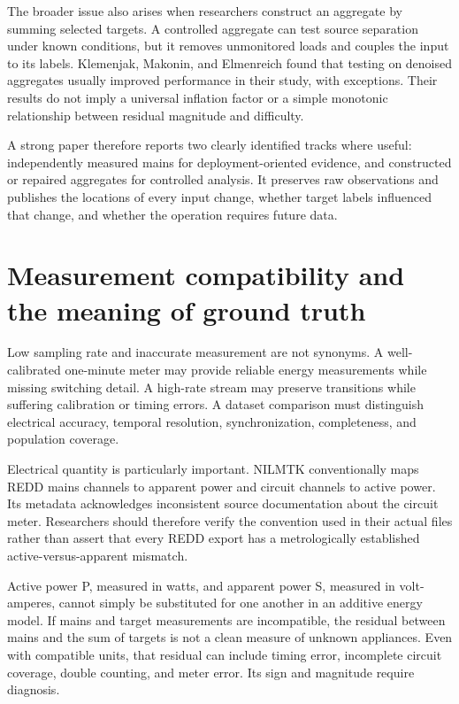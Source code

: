 \documentclass[11pt,letterpaper]{article}
\begin{document}
The broader issue also arises when researchers construct an aggregate by summing selected targets. A controlled aggregate can test source separation under known conditions, but it removes unmonitored loads and couples the input to its labels. Klemenjak, Makonin, and Elmenreich found that testing on denoised aggregates usually improved performance in their study, with exceptions. Their results do not imply a universal inflation factor or a simple monotonic relationship between residual magnitude and difficulty. \cite{ref11}

A strong paper therefore reports two clearly identified tracks where useful: independently measured mains for deployment-oriented evidence, and constructed or repaired aggregates for controlled analysis. It preserves raw observations and publishes the locations of every input change, whether target labels influenced that change, and whether the operation requires future data.

\section{Measurement compatibility and the meaning of ground truth}
Low sampling rate and inaccurate measurement are not synonyms. A well-calibrated one-minute meter may provide reliable energy measurements while missing switching detail. A high-rate stream may preserve transitions while suffering calibration or timing errors. A dataset comparison must distinguish electrical accuracy, temporal resolution, synchronization, completeness, and population coverage.

Electrical quantity is particularly important. NILMTK conventionally maps REDD mains channels to apparent power and circuit channels to active power. Its metadata acknowledges inconsistent source documentation about the circuit meter. Researchers should therefore verify the convention used in their actual files rather than assert that every REDD export has a metrologically established active-versus-apparent mismatch. \cite{ref3}

Active power P, measured in watts, and apparent power S, measured in volt-amperes, cannot simply be substituted for one another in an additive energy model. If mains and target measurements are incompatible, the residual between mains and the sum of targets is not a clean measure of unknown appliances. Even with compatible units, that residual can include timing error, incomplete circuit coverage, double counting, and meter error. Its sign and magnitude require diagnosis.
\end{document}
